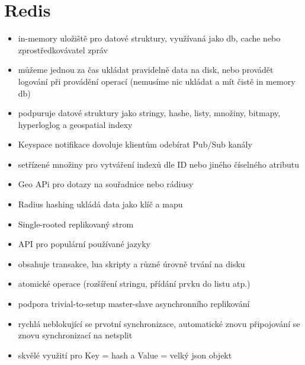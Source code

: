 \documentclass[czech,bachelor,dept460,male,csharp,cpdeclaration]{diploma}
\begin{document}
	\section{Redis}
		\begin{itemize}
			\item in-memory uložiště pro datové struktury, využívaná jako db, cache nebo zprostředkovávatel zpráv
			\item můžeme jednou za čas ukládat pravidelně data na disk, nebo provádět logování při provádění operací (nemusíme nic ukládat a mít čistě in memory db)
			\item podpuruje datové struktury jako stringy, hashe, listy, množiny, bitmapy, hyperloglog a geospatial indexy
			\item Keyspace notifikace dovoluje klientům odebírat Pub/Sub kanály
			\item setřízené množiny pro vytváření indexů dle ID nebo jiného číselného atributu
			\item Geo APi pro dotazy na souřadnice nebo rádiusy
			\item Radius hashing ukládá data jako klíč a mapu
			\item Single-rooted replikovaný strom
			\item API pro populární používané jazyky
			\item obsahuje transakce, lua skripty a různé úrovně trvání na disku
			\item atomické operace (rozšíření stringu, přídání prvku do listu atp.)
			\item podpora trivial-to-setup master-slave asynchronního replikování
			\item rychlá neblokující se prvotní synchronizace, automatické znovu připojování se znovu synchronizací na netsplit
			\item skvělé využití pro Key = hash a Value = velký json objekt
		\end{itemize}
	
\end{document}
